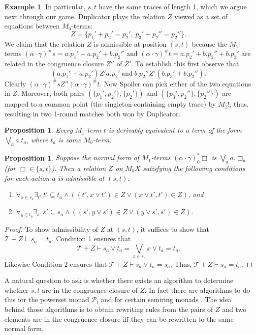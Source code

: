 \documentclass[sigconf,
			final%
			nonacm
                        ]{acmart}
\numberwithin{equation}{section}
\numberwithin{equation}{section}
\theoremstyle{plain}
\newtheorem{propn}[thm]{Proposition}
\theoremstyle{definition}
\newtheorem{expl}[thm]{Example}
\newcommand{\T}{\mathcal{T}}                     %
\newcommand{\pow}{\mathscr P}              %
\newcommand{\powf}{\pow_{\mathsf f}}
\begin{document}
{\begin{expl}
  In particular, $s,t$ have the same traces of length 1, which we argue next through our game. Duplicator plays the relation $Z$ viewed as a set of equations between $M_0$-terms:
  \[
  Z = \{p_1' + p_2' = p_2',\ p_3' + p_2'' = p_2'' \}.
  \]
  We claim that the relation $Z$ is admissible at position $(s,t)$ because the $M_1$-terms $(\alpha\cdot\gamma)^\# s=a.p_1' + a.p_2' + b.p_2''$ and $(\alpha\cdot\gamma)^\# t=a.p_2' + b.p_2'' + b.p_3'$ are related in the congruence closure $Z''$ of $Z'$. To establish this first observe that
  \[
  (a.p_1' + a.p_2') \mathrel {Z'} a.p_2'\ \text{and}\ b.p_2''\mathrel {Z'} (b.p_3' + b.p_2'').
  \]
  Clearly $(\alpha\cdot\gamma)^\# s\mathrel {Z''} (\alpha\cdot\gamma)^\# t$. Now Spoiler can pick either of the two equations in $Z$. Moreover, both pairs $(\{p_1',p_2'\},\{p_2'\})$ and $(\{p_3',p_2''\},\{p_2''\})$ are mapped to a common point (the singleton containing empty trace) by $M_1!$; thus, resulting in two 1-round matches both won by Duplicator.
\end{expl}
\begin{propn}
  Every $M_1$-term $t$ is derivably equivalent to a term of the form $\bigvee_{a}a.t_a$, where $t_a$ is some $M_0$-term.
\end{propn}
\begin{propn}
  Suppose the normal form of $M_1$-terms $(\alpha\cdot\gamma)^*_0\Box$ is $\bigvee_{a} a.\Box_a$ (for $\Box\in\{s,t\}$). Then a relation $Z$ on $M_0X$ satisfying the following conditions for each action $a$ is admissible at $(s,t)$.
  \begin{enumerate}
    \item $\forall_{x\in s_a}\exists_{t'}\ t'\subseteq t_a \land \left((t',x\vee t') \in Z \lor (x\vee t',t')\in Z \right)$, and
    \item $\forall_{y\in t_a}\exists_{s'}\ s'\subseteq s_a \land \left((s',y\vee s') \in Z \lor (y\vee s',s')\in Z\right)$.
  \end{enumerate}
\end{propn}
\begin{proof}
  To show admissibility of $Z$ at $(s,t)$, it suffices to show that $\T+Z \vdash s_a=t_a$. Condition 1 ensures that
  \[
  \T+Z \vdash s_a \lor t_a = \bigvee_{x\in s_a} x \vee t_a = t_a.
  \]
  Likewise Condition 2 ensures that $\T+Z \vdash s_a \lor t_a = s_a$. Thus, $\T +Z \vdash s_a=t_a$.
\end{proof}
A natural question to ask is whether there exists an algorithm to
determine whether $s,t$ are in the congruence closure of $Z$. In fact
there are algorithms to do this for the powerset monad $\powf$
\cite{bp:checking-nfa-equiv} and for certain semiring monads
\cite{bkk:up-to-weighted}. The idea behind those algorithms is to
obtain rewriting rules from the pairs of $Z$ and two elements are in
the congruence closure iff they can be rewritten to the same normal
form.}
\end{document}
